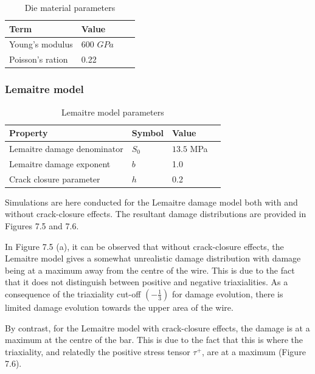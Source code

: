 \documentclass[sn-mathphys,Numbered,draft]{sn-jnl}%
\begin{document}
\begin{table}[htb]
	\centering
		\begin{tabular}{llll} \hline
			Term  & Value  \\ \hline 
            Young's modulus & 600 $GPa$ \\
			Poisson's ration & 0.22  \\
			\hline
		\end{tabular}
	\caption{Die material parameters}
	\label{tab:material_properties}
\end{table}


\FloatBarrier

\subsubsection{Lemaitre model}

\begin{table}[htb]
	\centering
		\begin{tabular}{llll} \hline
			Property & Symbol & Value  \\ \hline 
			Lemaitre damage denominator & $S_0$ & $13.5$ MPa  \\
			Lemaitre damage exponent & $b$ & 1.0  \\
            Crack closure parameter & $h$ & 0.2 \\
			\hline
		\end{tabular}
	\caption{Lemaitre model parameters}
	\label{tab:material_properties}
\end{table}

Simulations are here conducted for the Lemaitre damage model both with and without crack-closure effects. The resultant damage distributions are provided in Figures 7.5 and 7.6. 

In Figure 7.5 (a), it can be observed that without crack-closure effects, the Lemaitre model gives a somewhat unrealistic damage distribution with damage being at a maximum away from the centre of the wire. This is due to the fact that it does not distinguish between positive and negative triaxialities.  As a consequence of the triaxiality cut-off  $\left(-\frac{1}{3}\right)$ for damage evolution, there is limited damage evolution towards the upper area of the wire.

By contrast, for the Lemaitre model with crack-closure effects, the damage is at a maximum at the centre of the bar. This is due to the fact that this is where the triaxiality, and relatedly the positive stress tensor $\tau^+$, are at a maximum (Figure 7.6). 
\end{document}
